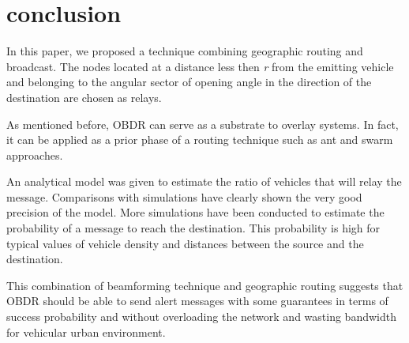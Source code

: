 \documentclass{IEEEtran}
\begin{document}
\section{conclusion}
In this paper, we proposed a technique combining geographic routing
and broadcast. The nodes located at a distance less then \emph{r}
from the emitting vehicle and belonging to the angular sector of
opening angle  in the direction of the destination are
chosen as relays.

As mentioned before, OBDR can serve as a substrate to overlay
systems. In fact, it can be applied as a prior phase of a routing
technique such as ant and swarm approaches.

An analytical model was given to estimate the ratio of vehicles that
will relay the message. Comparisons with simulations have clearly
shown the very good precision of the model. More simulations have
been conducted to estimate the probability of a message to reach the
destination. This probability is high for typical values of vehicle
density and distances between the source and the destination.

This combination of beamforming technique and geographic routing
suggests that OBDR should be able to send alert messages with some
guarantees in terms of success probability and without overloading
the network and wasting bandwidth for vehicular urban environment.
\end{document}
